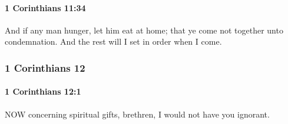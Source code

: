 		\paragraph{1 Corinthians 11:34} %
			\label{1CORINTHIANS-11-34}

			And if any man hunger, let him eat at home; that ye come not together unto condemnation.  And the rest will I set in order when I come.

			\begin{framed}
				\scriptsize
				\begin{compactdesc}
					\item[SBLG] 
				\end{compactdesc}
			\end{framed}

	\subsubsection{1 Corinthians 12} %
		\label{1CORINTHIANS-12}
		
		\paragraph{1 Corinthians 12:1} %
			\label{1CORINTHIANS-12-1}

			NOW concerning spiritual gifts, brethren, I would not have you ignorant.

